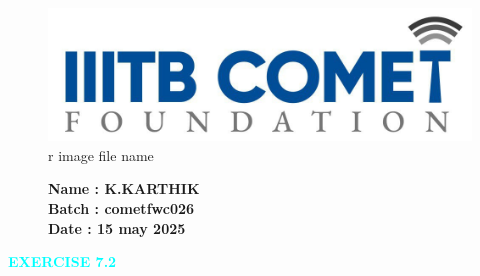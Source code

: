 \documentclass[a4paper,12pt]{article}
\begin{document}
                                                                   \begin{figure}[h!]
    \begin{minipage}{0.45\textwidth}  %
        \includegraphics[width=\textwidth]{sun.png}  %
r image file name
    \end{minipage} \hfill
    \begin{minipage}{0.45\textwidth}  %
        \textbf{Name : K.KARTHIK} \\
    \textbf{Batch : cometfwc026} \\
  \textbf{Date : 15 may 2025}
    \end{minipage}
\end{figure}
\begin{center}
  \textcolor{cyan}{\textbf{\Large EXERCISE 7.2}}
\end{center}
\end{document}
